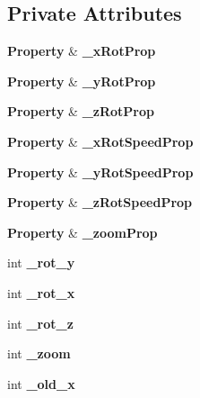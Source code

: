 \subsection*{Private Attributes}
\begin{DoxyCompactItemize}
\item 
{\bf Property} \& {\bfseries \-\_\-x\-Rot\-Prop}\label{classsfs__visualizer_1_1CameraControl_a936c7501505965fe2cc85e7bdf98a66c}

\item 
{\bf Property} \& {\bfseries \-\_\-y\-Rot\-Prop}\label{classsfs__visualizer_1_1CameraControl_a523d6496d4368028f000244667515045}

\item 
{\bf Property} \& {\bfseries \-\_\-z\-Rot\-Prop}\label{classsfs__visualizer_1_1CameraControl_a6770009d7cd09b7a8cc6cf8dfc8e3a9f}

\item 
{\bf Property} \& {\bfseries \-\_\-x\-Rot\-Speed\-Prop}\label{classsfs__visualizer_1_1CameraControl_abed8587f59344d9f60c2f9b585388b1e}

\item 
{\bf Property} \& {\bfseries \-\_\-y\-Rot\-Speed\-Prop}\label{classsfs__visualizer_1_1CameraControl_a98e942491c2dbeff799b928f33949258}

\item 
{\bf Property} \& {\bfseries \-\_\-z\-Rot\-Speed\-Prop}\label{classsfs__visualizer_1_1CameraControl_a77143f7a759158fa4ca529df2c96f0aa}

\item 
{\bf Property} \& {\bfseries \-\_\-zoom\-Prop}\label{classsfs__visualizer_1_1CameraControl_a9f499e7a4351de5ce1110d342d117365}

\item 
int {\bfseries \-\_\-rot\-\_\-y}\label{classsfs__visualizer_1_1CameraControl_ad2e09efef85a9f2c11c368fb2b5a4340}

\item 
int {\bfseries \-\_\-rot\-\_\-x}\label{classsfs__visualizer_1_1CameraControl_adef736ee98d2b4a68f741521c9e51d30}

\item 
int {\bfseries \-\_\-rot\-\_\-z}\label{classsfs__visualizer_1_1CameraControl_aba1520613eee5bac18fe41face73ae60}

\item 
int {\bfseries \-\_\-zoom}\label{classsfs__visualizer_1_1CameraControl_a8d462a2cc5b46e4c7f4b25384e98b4a5}

\item 
int {\bfseries \-\_\-old\-\_\-x}\label{classsfs__visualizer_1_1CameraControl_afd2b2df2e93e7269863a887c5034c93a}


\end{DoxyCompactItemize}
